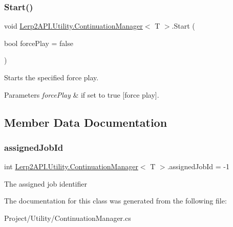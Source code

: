 \subsubsection{\texorpdfstring{Start()}{Start()}}
{\footnotesize\ttfamily void \hyperlink{class_lerp2_a_p_i_1_1_utility_1_1_continuation_manager}{Lerp2\+A\+P\+I.\+Utility.\+Continuation\+Manager}$<$ T $>$.Start (\begin{DoxyParamCaption}\item[{bool}]{force\+Play = {\ttfamily false} }\end{DoxyParamCaption})\hspace{0.3cm}{\ttfamily [inline]}}



Starts the specified force play. 


\begin{DoxyParams}{Parameters}
{\em force\+Play} & if set to {\ttfamily true} \mbox{[}force play\mbox{]}.\\
\hline
\end{DoxyParams}


\subsection{Member Data Documentation}
\mbox{\label{class_lerp2_a_p_i_1_1_utility_1_1_continuation_manager_ad61df6f6506156539d46d550894fba06}} 
\subsubsection{\texorpdfstring{assigned\+Job\+Id}{assignedJobId}}
{\footnotesize\ttfamily int \hyperlink{class_lerp2_a_p_i_1_1_utility_1_1_continuation_manager}{Lerp2\+A\+P\+I.\+Utility.\+Continuation\+Manager}$<$ T $>$.assigned\+Job\+Id = -\/1}



The assigned job identifier 



The documentation for this class was generated from the following file\+:\begin{DoxyCompactItemize}
\item 
Project/\+Utility/Continuation\+Manager.\+cs\end{DoxyCompactItemize}
